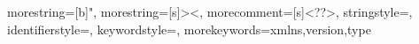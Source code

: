     
{
  morestring=[b]",
  morestring=[s]{>}{<},
  morecomment=[s]{<?}{?>},
  stringstyle=\color{black},
  identifierstyle=\color{darkblue},
  keywordstyle=\color{cyan},
  morekeywords={xmlns,version,type}%
}

\usepackage{multirow}
\usepackage{pifont}

\usepackage[nomain,acronym,nonumberlist,nopostdot]{glossaries}
\let\glossarysection\chapter
\renewcommand*{\acronymname}{List of Abbreviations}
\makeglossaries
